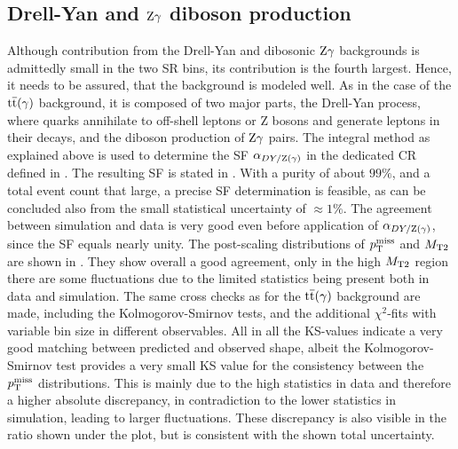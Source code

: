 \subsection{Drell-Yan and $\mathrm{Z}\gamma$ diboson production}
Although contribution from the Drell-Yan and dibosonic $\mathrm{Z}\gamma$ backgrounds is admittedly small in the two SR bins, its contribution is the fourth largest. Hence, it needs to be assured, that the background is modeled well. As in the case of the ${\mathrm{t}\overline{\mathrm{t}}}(\gamma)$ background, it is composed of two major parts, the Drell-Yan process, where quarks annihilate to off-shell leptons or Z bosons and generate leptons in their decays, and the diboson production of $\mathrm{Z}\gamma$ pairs. The integral method as explained above is used to determine the SF $\alpha_{DY/\mathrm{Z}(\gamma)}$ in the dedicated CR defined in .
The resulting SF is stated in . With a purity of about $99\%$, and a total event count that large, a precise SF determination is feasible, as can be concluded also from the small statistical uncertainty of $\approx1\%$. The agreement between simulation and data is very good even before application of $\alpha_{DY/\mathrm{Z}(\gamma)}$, since the SF equals nearly unity. The post-scaling distributions of $p_{\mathrm{T}}^\text{miss}$ and $M_{\mathrm{T2}}$ are shown in . They show overall a good agreement, only in the high $M_{\mathrm{T2}}$ region there are some fluctuations due to the limited statistics being present both in data and simulation.
The same cross checks as for the ${\mathrm{t}\overline{\mathrm{t}}}(\gamma)$ background are made, including the Kolmogorov-Smirnov tests, and the additional $\chi^2$-fits with variable bin size in different observables.
All in all the KS-values indicate a very good matching between predicted and observed shape, albeit the Kolmogorov-Smirnov test provides a very small KS value for the consistency between the $p_{\mathrm{T}}^\text{miss}$ distributions. This is mainly due to the high statistics in data and therefore a higher absolute discrepancy, in contradiction to the lower statistics in simulation, leading to larger fluctuations. These discrepancy is also visible in the ratio shown under the plot, but is consistent with the shown total uncertainty.\\
